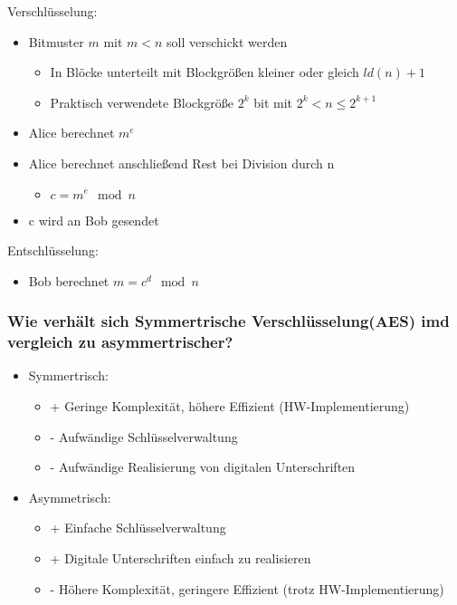 	Verschlüsselung:
	\begin{itemize}
		\item Bitmuster $m$ mit $m < n$ soll verschickt werden
		\begin{itemize}
			\item In Blöcke unterteilt mit Blockgrößen kleiner oder gleich $ld(n)+1$ 
			\item Praktisch verwendete Blockgröße $2^k$ bit mit $2^k < n \leq 2^{k+1}$	
		\end{itemize}
		\item Alice berechnet $m^e$
		\item Alice berechnet anschließend Rest bei Division durch n
		\begin{itemize}
			\item $c = m^e \mod n$
		\end{itemize}
		\item c wird an Bob gesendet
	\end{itemize}
	
	Entschlüsselung:
	\begin{itemize}
		\item Bob berechnet $ m = c^d \mod n$
	\end{itemize}
	
	\subsubsection{Wie verhält sich Symmertrische Verschlüsselung(AES) imd vergleich zu asymmertrischer?}
	\begin{itemize}
		\item Symmertrisch:
		\begin{itemize}
			\item + Geringe Komplexität, höhere Effizient (HW-Implementierung)
			\item - Aufwändige Schlüsselverwaltung
			\item - Aufwändige Realisierung von digitalen Unterschriften
		\end{itemize}
		
		\item Asymmetrisch:
		\begin{itemize}
			\item + Einfache Schlüsselverwaltung
			\item + Digitale Unterschriften einfach zu realisieren
			\item - Höhere Komplexität, geringere Effizient (trotz HW-Implementierung)
		\end{itemize}
	\end{itemize}
	

